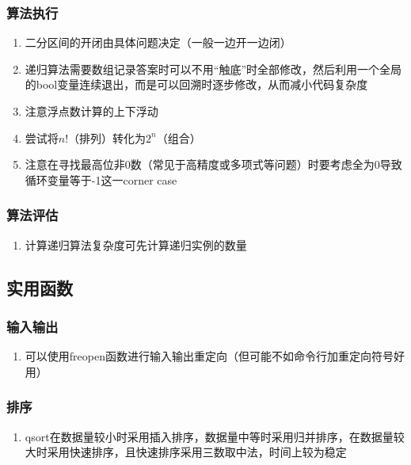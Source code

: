 \documentclass[onecolumn]{article}
\begin{document}
        \subsubsection{算法执行}
            \noindent
            \begin{enumerate}
                \item 二分区间的开闭由具体问题决定（一般一边开一边闭）
                \item 递归算法需要数组记录答案时可以不用“触底”时全部修改，然后利用一个全局的bool变量连续退出，而是可以回溯时逐步修改，从而减小代码复杂度
                \item 注意浮点数计算的上下浮动
                \item 尝试将$n!$（排列）转化为$2^n$（组合）
                \item 注意在寻找最高位非0数（常见于高精度或多项式等问题）时要考虑全为0导致循环变量等于-1这一corner case
            \end{enumerate}
        \subsubsection{算法评估}
            \noindent
            \begin{enumerate}
                \item 计算递归算法复杂度可先计算递归实例的数量
            \end{enumerate}
    \subsection{实用函数}
        \subsubsection{输入输出}
            \noindent
            \begin{enumerate}
                \item 可以使用freopen函数进行输入输出重定向（但可能不如命令行加重定向符号好用）
            \end{enumerate}
        \subsubsection{排序}
            \noindent
            \begin{enumerate}
                \item qsort在数据量较小时采用插入排序，数据量中等时采用归并排序，在数据量较大时采用快速排序，且快速排序采用三数取中法，时间上较为稳定
            \end{enumerate}        
\end{document}
